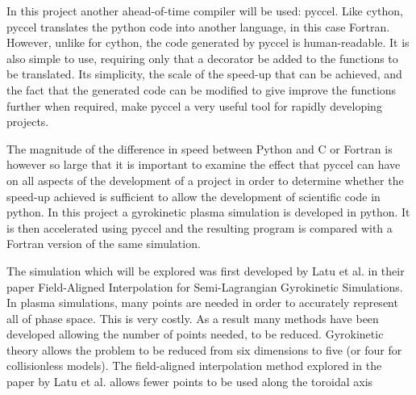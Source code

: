 In this project another ahead-of-time compiler will be used: pyccel. Like cython, pyccel translates the python code into another language, in this case Fortran. However, unlike for cython, the code generated by pyccel is human-readable. It is also simple to use, requiring only that a decorator be added to the functions to be translated. Its simplicity, the scale of the speed-up that can be achieved, and the fact that the generated code can be modified to give improve the functions further when required, make pyccel a very useful tool for rapidly developing projects.

The magnitude of the difference in speed between Python and C or Fortran is however so large that it is important to examine the effect that pyccel can have on all aspects of the development of a project in order to determine whether the speed-up achieved is sufficient to allow the development of scientific code in python. In this project a gyrokinetic plasma simulation is developed in python. It is then accelerated using pyccel and the resulting program is compared with a Fortran version of the same simulation.

The simulation which will be explored was first developed by Latu et al. \cite{YamanPaper} in their paper Field-Aligned Interpolation for Semi-Lagrangian Gyrokinetic Simulations. In plasma simulations, many points are needed in order to accurately represent all of phase space. This is very costly. As a result many methods have been developed allowing the number of points needed, to be reduced. Gyrokinetic theory allows the problem to be reduced from six dimensions to five (or four for collisionless models). The field-aligned interpolation method explored in the paper by Latu et al. allows fewer points to be used along the toroidal axis